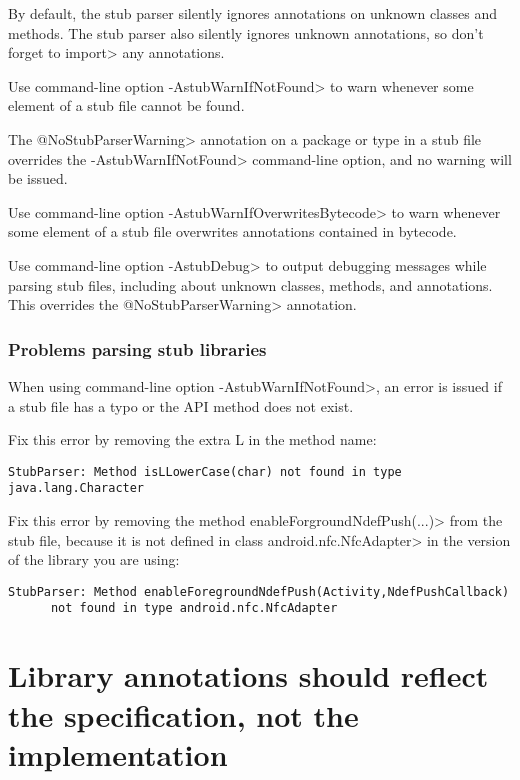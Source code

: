 By default, the stub parser silently ignores
annotations on unknown classes and methods.
The stub parser also silently ignores unknown annotations, so don't forget to
\<import> any annotations.

Use command-line option
\<-AstubWarnIfNotFound> to warn whenever some element of a stub file cannot
be found.

The \<@NoStubParserWarning> annotation on a package or type in a stub file
overrides the \<-AstubWarnIfNotFound> command-line option, and no warning
will be issued.

Use command-line option
\<-AstubWarnIfOverwritesBytecode> to warn whenever some element of a
stub file overwrites annotations contained in bytecode.

Use command-line option \<-AstubDebug> to output debugging messages while
parsing stub files, including about unknown classes, methods, and
annotations.  This overrides the \<@NoStubParserWarning> annotation.



\subsubsection{Problems parsing stub libraries\label{stub-troubleshooting-parsing}}

When using command-line option \<-AstubWarnIfNotFound>,
an error is issued if a stub file has a typo or the API method does not
exist.

Fix this error by removing the extra L in the method name:
\begin{Verbatim}
StubParser: Method isLLowerCase(char) not found in type java.lang.Character
\end{Verbatim}

Fix this error by removing the method \<enableForgroundNdefPush(...)> from
the stub file, because it is not defined in class \<android.nfc.NfcAdapter>
in the version of the library you are using:
\begin{Verbatim}
StubParser: Method enableForegroundNdefPush(Activity,NdefPushCallback)
      not found in type android.nfc.NfcAdapter
\end{Verbatim}


\section{Library annotations should reflect the specification, not the implementation\label{libraries-specification}}

